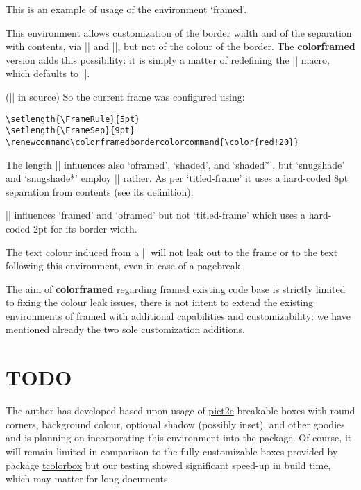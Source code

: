 \documentclass[a4paper,dvipdfmx,11pt,english]{article}
\def\colorframedbordercolorcommand{\color{red!20}}
\def\ctanpackage#1{\href{https://ctan.org/pkg/#1}{#1}}
\newcommand\colorframed{%
        \texorpdfstring{{\color{joli}\bfseries colorframed}}{colorframed}\xspace}
\begin{document}
\begin{framed}
  This is an example of usage of the environment `framed'.

  This environment allows customization of the border width
  and of the separation with contents, via |\FrameRule| and
  |\FrameSep|, but not of the colour of the border.  The
  \colorframed version adds this possibility: it is simply a
  matter of redefining the |\colorframedbordercolorcommand|
  macro, which defaults to |\normalcolor|.

\footnotesize (|\color{blue}| in source)
\normalsize
\color{blue}
  So the current frame was configured using:
\begin{verbatim}
\setlength{\FrameRule}{5pt}
\setlength{\FrameSep}{9pt}
\renewcommand\colorframedbordercolorcommand{\color{red!20}}
\end{verbatim}
\begin{footnotesize}\normalcolor
  The length |\FrameSep| influences also `oframed', `shaded', and `shaded*',
  but `snugshade' and `snugshade*' employ |\fboxsep| rather.  As per `titled-frame'
  it uses a hard-coded 8pt separation from contents (see its definition).

  |\FrameRule| influences `framed' and `oframed' but not
  `titled-frame' which uses a hard-coded 2pt for its border width.\par
\end{footnotesize}
  The text colour induced from a |\color{blue}|
  will not leak out to the frame or to the text following this
  environment, even in case of a pagebreak.
\end{framed}

The aim of \colorframed regarding \ctanpackage{framed} existing
code base is strictly limited to fixing the colour leak issues,
there is not intent to extend the existing environments of
\ctanpackage{framed} with additional capabilities and
customizability: we have mentioned already the two sole
customization additions.

\section{TODO}

The author has developed based upon usage of \ctanpackage{pict2e}
breakable boxes with round corners, background colour, optional
shadow (possibly inset), and other goodies and is planning on
incorporating this environment into the package.
%
Of course, it will remain limited in comparison to the fully
customizable boxes provided by package \ctanpackage{tcolorbox}
but our testing showed significant speed-up in build time, which
may matter for long documents.
\end{document}

